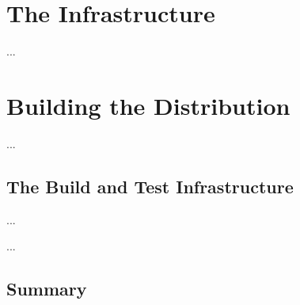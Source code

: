 
\chapter{The  Infrastructure}
\label{cha:Infrastructure}

...

\cite{PAMS2013-NorNet}


\chapter{Building the  Distribution}
\label{cha:Distribution}

...

\section{The Build and Test Infrastructure}
\label{sec:The-Build-and-Test-Infrastructure}

...


...

\section{Summary}

